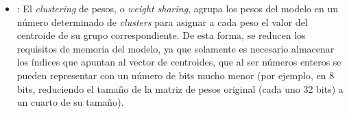 \begin{itemize}
\begin{itemize}
    \end{itemize}
    \item {}: El \textit{clustering} de pesos, o \textit{weight sharing}, agrupa los pesos del modelo en un número determinado de \textit{clusters} para asignar a cada peso el valor del centroide de su grupo correspondiente. De esta forma, se reducen los requisitos de memoria del modelo, ya que solamente es necesario almacenar los índices que apuntan al vector de centroides, que al ser números enteros se pueden representar con un número de bits mucho menor (por ejemplo, en 8 bits, reduciendo el tamaño de la matriz de pesos original (cada uno 32 bits) a un cuarto de su tamaño).
    

\end{itemize}
